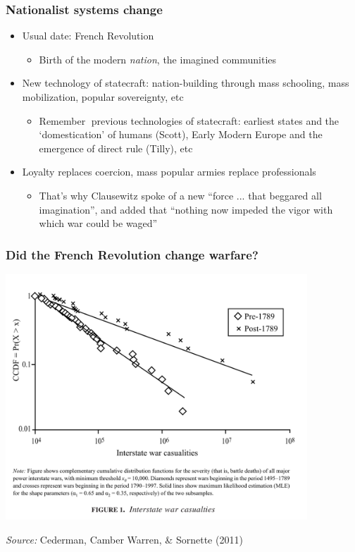 \documentclass[aspectratio=43]{beamer}
\begin{document}
\begin{frame}
\frametitle{Nationalist systems change}
\centering

\begin{itemize}
  \item Usual date: French Revolution
  \begin{itemize}
    \item Birth of the modern \textit{nation}, the imagined communities
  \end{itemize}
  \item New technology of statecraft: nation-building through mass schooling, mass mobilization, popular sovereignty, etc
  \begin{itemize}
    \item Remember previous technologies of statecraft: earliest states and the `domestication' of humans (Scott), Early Modern Europe and the emergence of direct rule (Tilly), etc
  \end{itemize}
  \item Loyalty replaces coercion, mass popular armies replace professionals
  \begin{itemize}
    \item That's why Clausewitz spoke of a new ``force ... that beggared all imagination'', and added that ``nothing now impeded the vigor with which war could be waged''
  \end{itemize}
\end{itemize}

\end{frame}

\begin{frame}
\frametitle{Did the French Revolution change warfare?}
\centering

\includegraphics[width = 0.85\textwidth]{img/cederman_et_al_fig1}

{\scriptsize \textit{Source:} Cederman, Camber Warren, \& Sornette (2011)}

\end{frame}
\end{document}

